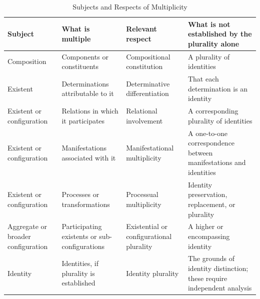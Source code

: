 %
%
%
%

\begin{table}[htbp]
\centering
\caption{Subjects and Respects of Multiplicity}
\label{tab:subjects-and-respects-of-multiplicity}
\small
\setlength{\tabcolsep}{4pt}
\renewcommand{\arraystretch}{1.15}
\begin{tabular}{|>{\raggedright\arraybackslash}p{}|>{\raggedright\arraybackslash}p{}|>{\raggedright\arraybackslash}p{}|>{\raggedright\arraybackslash}p{}|}
\hline
\textbf{Subject} &
\textbf{What is multiple} &
\textbf{Relevant respect} &
\textbf{What is not established by the plurality alone}
\\
\hline
Composition &
Components or constituents &
Compositional constitution &
A plurality of identities
\\
\hline
Existent &
Determinations attributable to it &
Determinative differentiation &
That each determination is an identity
\\
\hline
Existent or configuration &
Relations in which it participates &
Relational involvement &
A corresponding plurality of identities
\\
\hline
Existent or configuration &
Manifestations associated with it &
Manifestational multiplicity &
A one-to-one correspondence between manifestations and identities
\\
\hline
Existent or configuration &
Processes or transformations &
Processual multiplicity &
Identity preservation, replacement, or plurality
\\
\hline
Aggregate or broader configuration &
Participating existents or sub-configurations &
Existential or configurational plurality &
A higher or encompassing identity
\\
\hline
Identity &
Identities, if plurality is established &
Identity plurality &
The grounds of identity distinction; these require independent analysis
\\
\hline
\end{tabular}
\end{table}

